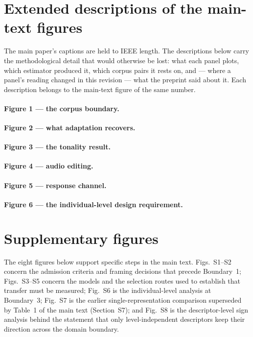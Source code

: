 \section{Extended descriptions of the main-text figures}
\label{sec:mainfigdesc}

The main paper's captions are held to IEEE length. The descriptions below carry
the methodological detail that would otherwise be lost: what each panel plots,
which estimator produced it, which corpus pairs it rests on, and --- where a
panel's reading changed in this revision --- what the preprint said about it.
Each description belongs to the main-text figure of the same number.

\paragraph{Figure 1 --- the corpus boundary.} \legendfigone

\paragraph{Figure 2 --- what adaptation recovers.} \legendfigtwo

\paragraph{Figure 3 --- the tonality result.} \legendfigthree

\paragraph{Figure 4 --- audio editing.} \legendfigfour

\paragraph{Figure 5 --- response channel.} \legendfigfive

\paragraph{Figure 6 --- the individual-level design requirement.}
\legendfigsix

\clearpage
\section{Supplementary figures}

The eight figures below support specific steps in the main text.
Figs.~S1--S2 concern the admission criteria and framing decisions that precede
Boundary~1; Figs.~S3--S5 concern the models and the selection routes used to
establish that transfer must be measured; Fig.~S6 is the individual-level
analysis at Boundary~3; Fig.~S7 is the earlier single-representation comparison
superseded by Table~1 of the main text (Section~S7); and Fig.~S8 is the
descriptor-level sign analysis behind the statement that only level-independent
descriptors keep their direction across the domain boundary.

